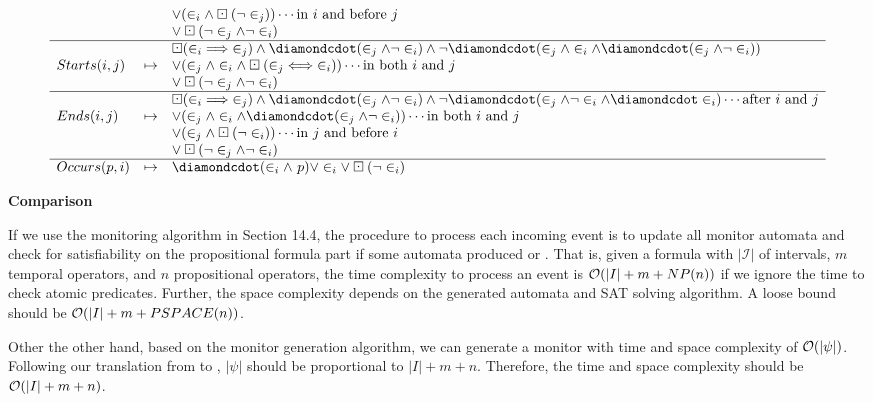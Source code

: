 \documentclass{article}
\begin{document}
\begin{enumerate}
\begin{table}[t]
$$\begin{array}{lcl}
	              &         & \lor (\in_i\land \PastG(\neg\in_j)) \cdots \text{in $i$ and before $j$}        \\
	              &         & \lor \PastG (\neg \in_j \land \neg \in_i)                                      \\ \hline
	              &         & \PastG (\in_i \implies \in_j) \land \PastF(\in_j \land \neg \in_i) \land \neg \PastF(
	              \in_j \land \in_i \land \PastF(\in_j \land \neg \in_i)) \\
	Starts(i,j)   & \mapsto & \lor (\in_j \land \in_i \land \PastG(\in_j \iff \in_i)) \cdots \text{in both $i$ and $j$}\\
	              &         & \lor \PastG (\neg \in_j \land \neg \in_i)                                      \\ \hline
	              &         & \PastG (\in_i \implies \in_j) \land \PastF(\in_j \land \neg \in_i) \land \neg \PastF(
	              	              \in_j \land \neg \in_i \land \PastF\in_i) \cdots \text{after $i$ and $j$} \\
	Ends(i,j)     & \mapsto & \lor (\in_j\land\in_i\land\PastF(\in_j\land\neg\in_i)) \cdots \text{in both $i$ and $j$} \\
	              &         & \lor (\in_j\land \PastG(\neg\in_i)) \cdots \text{in $j$ and before $i$}        \\
	              &         & \lor \PastG (\neg \in_j \land \neg \in_i)                                      \\ \hline
	Occurs(p, i)  & \mapsto & \PastF (\in_i \land\ p) \lor \in_i \lor \PastG(\neg \in_i)  \\
\end{array}
$$
\end{table}

\textbf{Comparison}

If we use the \ALTL monitoring algorithm in Section 14.4,
the procedure to process each incoming event is to update all monitor automata
and check for satisfiability on the propositional formula part if some automata
produced \TT or \FF.
That is, given a \ALTL formula with $|\mathcal{I}|$ of intervals, $m$ \ALTL
temporal operators, and $n$ propositional operators,
the time complexity to process an event is $\mathcal{O}(|I| + m + NP(n))$ if we ignore
the time to check atomic predicates.
Further, the space complexity depends on the generated automata and SAT solving
algorithm.
A loose bound should be $\mathcal{O}(|I| + m + PSPACE(n))$.

Other the other hand, based on the \ptLTL monitor generation algorithm,
we can generate a monitor with time and space complexity of $\mathcal{O}(|\psi|)$.
Following our translation from \ALTL to \ptLTL,
$|\psi|$ should be proportional to $|I| + m + n$.
Therefore, the time and space complexity should be $\mathcal{O}(|I| + m + n)$. 

\end{enumerate}
\end{document}
